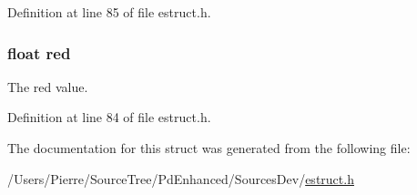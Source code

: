 Definition at line 85 of file estruct.\-h.

\hypertarget{struct__rgb_acddf4f34ba92c602d4205ba50e98d603}{
\subsubsection[{red}]{\setlength{\rightskip}{0pt plus 5cm}float red}}\label{struct__rgb_acddf4f34ba92c602d4205ba50e98d603}
The red value. 

Definition at line 84 of file estruct.\-h.



The documentation for this struct was generated from the following file\-:\begin{DoxyCompactItemize}
\item 
/\-Users/\-Pierre/\-Source\-Tree/\-Pd\-Enhanced/\-Sources\-Dev/\hyperlink{estruct_8h}{estruct.\-h}\end{DoxyCompactItemize}
